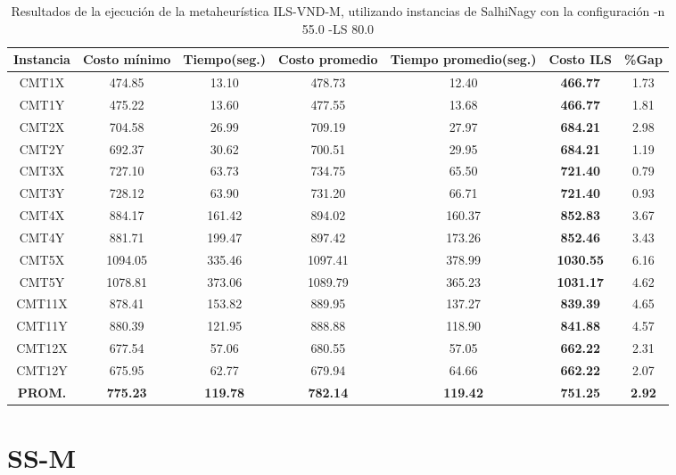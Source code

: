 \begin{table}[h]
\caption{Resultados de la ejecución de la metaheurística ILS-VND-M, utilizando instancias de SalhiNagy con la configuración -n 55.0 -LS 80.0}
\centering
\small
\begin{tabular}{c c c c c c c}
\hline\hline
Instancia & Costo mínimo & Tiempo(seg.) & Costo promedio & Tiempo promedio(seg.) & Costo ILS & \%Gap \\ [0.5ex]
\hline
CMT1X & 474.85 & 13.10 & 
478.73 & 12.40 & \bf{466.77} & 
1.73\\CMT1Y & 475.22 & 13.60 & 
477.55 & 13.68 & \bf{466.77} & 
1.81\\CMT2X & 704.58 & 26.99 & 
709.19 & 27.97 & \bf{684.21} & 
2.98\\CMT2Y & 692.37 & 30.62 & 
700.51 & 29.95 & \bf{684.21} & 
1.19\\CMT3X & 727.10 & 63.73 & 
734.75 & 65.50 & \bf{721.40} & 
0.79\\CMT3Y & 728.12 & 63.90 & 
731.20 & 66.71 & \bf{721.40} & 
0.93\\CMT4X & 884.17 & 161.42 & 
894.02 & 160.37 & \bf{852.83} & 
3.67\\CMT4Y & 881.71 & 199.47 & 
897.42 & 173.26 & \bf{852.46} & 
3.43\\CMT5X & 1094.05 & 335.46 & 
1097.41 & 378.99 & \bf{1030.55} & 
6.16\\CMT5Y & 1078.81 & 373.06 & 
1089.79 & 365.23 & \bf{1031.17} & 
4.62\\CMT11X & 878.41 & 153.82 & 
889.95 & 137.27 & \bf{839.39} & 
4.65\\CMT11Y & 880.39 & 121.95 & 
888.88 & 118.90 & \bf{841.88} & 
4.57\\CMT12X & 677.54 & 57.06 & 
680.55 & 57.05 & \bf{662.22} & 
2.31\\CMT12Y & 675.95 & 62.77 & 
679.94 & 64.66 & \bf{662.22} & 
2.07\\\bf{PROM.} & 
\bf{775.23} & \bf{119.78} & \bf{782.14} & \bf{119.42} & \bf{751.25} & \bf{2.92}\\[1ex]\hline
\end{tabular}
\label{table:ILS-VND-M-55-80}
\end{table}

\clearpage
\section{SS-M}

